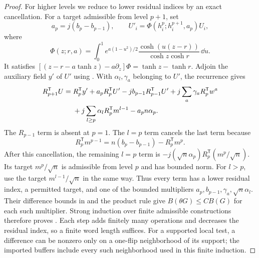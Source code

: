 \begin{proof}
For higher levels we reduce to lower residual indices by an exact
cancellation.  For a target admissible from level $p+1$, set
\[
 a_p=j(b_p-b_{p-1}),\qquad
 U'_i=\Phi(h_i^p;h_i^{p+1},a_p)U_i,
\]
where
\begin{equation}\label{eq:stat-Phi}
 \Phi(z;r,a)=\int_0^1 e^{a(1-u^2)/2}
       \frac{\cosh(u(z-r))}{\cosh z\cosh r}\,\dd u.
\end{equation}
It satisfies
$[(z-r-a\tanh z)-a\partial_z]\Phi=\tanh z-\tanh r$.
Adjoin the auxiliary field $y'$ of $U'$ using
.  With $\alpha_l,\gamma_a$ belonging to $U'$,
the recurrence gives
\begin{align}
 R_{p+1}^{\mathsf T}U
 ={}&R_p^{\mathsf T}y'+a_pR_p^{\mathsf T}U'
   -jb_{p-1}R_{p-1}^{\mathsf T}U'
   +j\sum_a\gamma_a R_p^{\mathsf T}w^a\notag\\
 &+j\sum_{l\ge p}\alpha_lR_p^{\mathsf T}m^{l-1}
   -a_p n\alpha_p.\label{eq:stat-residual-induction}
\end{align}
The $R_{p-1}$ term is absent at $p=1$.  The $l=p$ term cancels the last
term because
\[
 R_p^{\mathsf T}m^{p-1}
       =n(b_p-b_{p-1})-R_p^{\mathsf T}m^p.
\]
After this cancellation, the remaining $l=p$ term is
$-j(\sqrt n\alpha_p)R_p^{\mathsf T}(m^p/\sqrt n)$.
Its target $m^p/\sqrt n$ is admissible from level $p$ and has bounded
norm. For $l>p$, use the target $m^{l-1}/\sqrt n$ in the same way.
Thus every term has a lower residual index, a permitted target, and one
of the bounded multipliers $a_p,b_{p-1},\gamma_a,\sqrt n\alpha_l$.
Their difference bounds in  and the product
rule give $B(\theta G)\le C B(G)$ for each such multiplier.
Strong induction over finite admissible constructions therefore proves
.  Each step adds finitely many operations and
decreases the residual index, so a finite word length suffices.  For a
supported local test, a difference can be nonzero only on a one-flip
neighborhood of its support; the imported buffers include every such
neighborhood used in this finite induction.


\end{proof}
